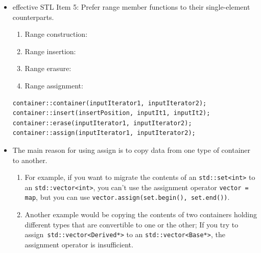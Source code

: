 \documentclass[a4paper,11pt,twoside]{book}
\begin{document}
\begin{itemize}
\item effective STL Item 5: Prefer range member functions to their single-element counterparts.
\begin{enumerate}
\item Range construction:
\item Range insertion:
\item Range erasure:
\item Range assignment:
\end{enumerate}

\begin{lstlisting}[numbers=none]
container::container(inputIterator1, inputIterator2);
container::insert(insertPosition, inputIt1, inputIt2);
container::erase(inputIterator1, inputIterator2);
container::assign(inputIterator1, inputIterator2);
\end{lstlisting}


\item The main reason for using assign is to copy data from one type of container to another.
\begin{enumerate}
\item For example, if you want to migrate the contents of an \texttt{std::set<int>} to an \texttt{std::vector<int>}, you can't use the assignment operator \texttt{vector = map}, but you can use \texttt{vector.assign(set.begin(), set.end())}.

\item Another example would be copying the contents of two containers holding different types that are convertible to one or the other; If you try to assign\texttt{ std::vector<Derived*>} to an \texttt{std::vector<Base*>}, the assignment operator is insufficient.

\end{enumerate}

\end{itemize}
\end{document}
